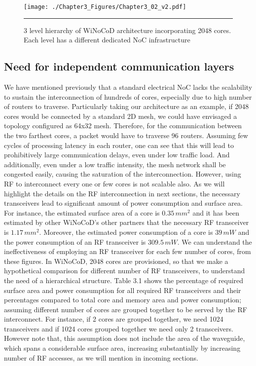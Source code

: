 \begin{figure}[htbp]
  \centering
    \texttt{[image: ./Chapter3\_Figures/Chapter3\_02\_v2.pdf]}
    \rule{35em}{0.5pt}
  \caption[3 level hierarchy of WiNoCoD architecture]{3 level hierarchy of WiNoCoD architecture incorporating 2048 cores. Each level has a different dedicated NoC infrastructure}
  \label{fig:Electron}
\end{figure}

\subsection{Need for independent communication layers}

We have mentioned previously that a standard electrical NoC lacks the scalability to sustain the interconnection of hundreds of cores, especially due to high number of routers to traverse. Particularly taking our architecture as an example, if 2048 cores would be connected by a standard 2D mesh, we could have envisaged a topology configured as 64x32 mesh. Therefore, for the communication between the two farthest cores, a packet would have to traverse 96 routers. Assuming few cycles of processing latency in each router, one can see that this will lead to prohibitively large communication delays, even under low traffic load. And additionally, even under a low traffic intensity, the mesh network shall be congested easily, causing the saturation of the interconnection. However, using RF to interconnect every one or few cores is not scalable also. As we will highlight the details on the RF interconnection in next sections, the necessary transceivers lead to significant amount of power consumption and surface area. For instance, the estimated surface area of a core is $0.35 \, mm^{2}$ and it has been estimated by other WiNoCoD's other partners that the necessary RF transceiver is $1.17 \, mm^{2}$. Moreover, the estimated power consumption of a core is $39 \, mW$ and the power consumption of an RF transceiver is $309.5 \, mW$. We can understand the ineffectiveness of employing an RF transceiver for each few number of cores, from these figures. In WiNoCoD, 2048 cores are provisioned, so that we make a hypothetical comparison for different number of RF transceivers, to understand the need of a hierarchical structure. Table 3.1 shows the percentage of required surface area and power consumption for all required RF transceivers and their percentages compared to total core and memory area and power consumption; assuming different number of cores are grouped together to be served by the RF interconnect. For instance, if 2 cores are grouped together, we need 1024 transceivers and if 1024 cores grouped together we need only 2 transceivers. However note that, this assumption does not include the area of the waveguide, which spans a considerable surface area, increasing substantially by increasing number of RF accesses, as we will mention in incoming sections. 

